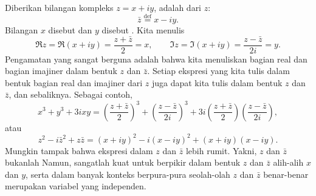 
Diberikan bilangan kompleks $z=x+iy$,  adalah
\emph{} dari $z$:
%
\begin{equation*}
\bar{z} \overset{\text{def}}{=} x-iy.
\end{equation*}
Bilangan $x$ disebut
\emph{} dan $y$ disebut
\emph{}. Kita menulis
%
%
\begin{equation*}
\Re z = 
\Re (x+iy) =
\frac{z+\bar{z}}{2}
= x, \qquad 
\Im z = 
\Im (x+iy) =
\frac{z-\bar{z}}{2i}
=
y .
\end{equation*}
Pengamatan yang sangat berguna adalah bahwa kita menuliskan
bagian real dan bagian imajiner dalam bentuk $z$ dan $\bar{z}$.
Setiap ekspresi yang kita tulis dalam bentuk bagian real dan imajiner dari $z$
juga dapat kita tulis dalam bentuk $z$ dan $\bar{z}$, dan sebaliknya.
Sebagai contoh,
\begin{equation*}
x^3 + y^3 + 3ixy
=
{\left( \frac{z+ \bar{z}}{2} \right)}^3 + 
{\left( \frac{z- \bar{z}}{2i} \right)}^3 + 
3i {\left( \frac{z+ \bar{z}}{2} \right)} 
{\left( \frac{z- \bar{z}}{2i} \right)} ,
\end{equation*}
atau
\begin{equation*}
z^2 - i \bar{z}^2 + z \bar{z}
=
{(x+iy)}^2 - i {(x-iy)}^2 + 
(x+iy)(x-iy) .
\end{equation*}
Mungkin tampak bahwa ekspresi dalam $z$ dan $\bar{z}$ lebih
rumit.
Yakni, $z$ dan $\bar{z}$ bukanlah
Namun, sangatlah kuat untuk berpikir dalam bentuk $z$ dan $\bar{z}$
alih-alih $x$ dan $y$, serta dalam banyak konteks berpura-pura seolah-olah
$z$ dan $\bar{z}$ benar-benar merupakan variabel yang independen.
